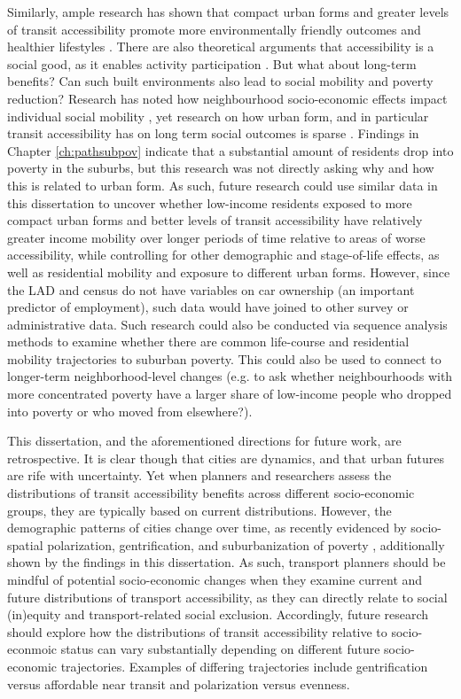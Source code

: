 Similarly, ample research has shown that compact urban forms and greater levels of transit accessibility promote more environmentally friendly outcomes and healthier lifestyles \cite{ewing_compactness_2015,ewing_travel_2010,cervero_travel_1997}. There are also theoretical arguments that accessibility is a social good, as it enables activity participation \cite{martens_transport_2016,pereira_distributive_2017}. But what about long-term benefits? Can such built environments also lead to social mobility and poverty reduction? Research has noted how neighbourhood socio-economic effects impact individual social mobility \cite{chetty_effects_2016}, yet research on how urban form, and in particular transit accessibility has on long term social outcomes is sparse \cite{ewing_does_2016,fransen_relationship_2019}. Findings in Chapter \ref{ch:pathsubpov} indicate that a substantial amount of residents drop into poverty in the suburbs, but this research was not directly asking why and how this is related to urban form. As such, future research could use similar data in this dissertation to uncover whether low-income residents exposed to more compact urban forms and better levels of transit accessibility have relatively greater income mobility over longer periods of time relative to areas of worse accessibility, while controlling for other demographic and stage-of-life effects, as well as residential mobility and exposure to different urban forms. However, since the LAD and census do not have variables on car ownership (an important predictor of employment), such data would have joined to other survey or administrative data. Such research could also be conducted via sequence analysis methods to examine whether there are common life-course and residential mobility trajectories to suburban poverty. This could also be used to connect to longer-term neighborhood-level changes (e.g. to ask whether neighbourhoods with more concentrated poverty have a larger share of low-income people who dropped into poverty or who moved from elsewhere?). 

This dissertation, and the aforementioned directions for future work, are retrospective. It is clear though that cities are dynamics, and that urban futures are rife with uncertainty. Yet when planners and researchers assess the distributions of transit accessibility benefits across different socio-economic groups, they are typically based on current distributions. However, the demographic patterns of cities change over time, as recently evidenced by socio-spatial polarization, gentrification, and suburbanization of poverty \cite{ades_are_2012,van_ham_understanding_2013,grant_changing_2020}, additionally shown by the findings in this dissertation. As such, transport planners should be mindful of potential socio-economic changes when they examine current and future distributions of transport accessibility, as they can directly relate to social (in)equity and transport-related social exclusion. Accordingly, future research should explore how the distributions of transit accessibility relative to socio-econmoic status can vary substantially depending on different future socio-economic trajectories. Examples of differing trajectories include gentrification versus affordable near transit and polarization versus evenness. 

